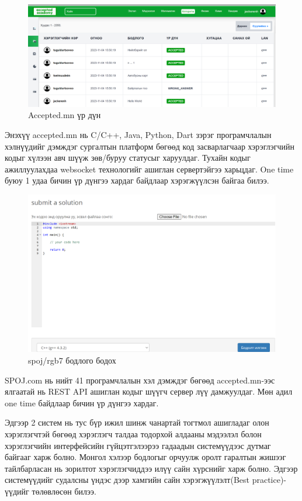 \begin{figure}[h]
  \centering
  \includegraphics[width=15cm]{img/accepted-judger.PNG}
  \caption{Accepted.mn үр дүн}
\end{figure}

Энэхүү accepted.mn\cite{acceptedmn} нь C/C++, Java, Python, Dart зэрэг програмчлалын хэлнүүдийг дэмждэг сургалтын платформ бөгөөд код засварлагчаар хэрэглэгчийн кодыг хүлээн авч шүүж зөв/буруу статусыг харуулдаг. Тухайн кодыг ажиллуулахдаа websocket технологийг ашиглан сервертэйгээ харьцдаг. One time буюу 1 удаа бичин үр дүнгээ хардаг байдлаар хэрэгжүүлсэн байгаа билээ. 

\begin{figure}[h]
  \centering
  \includegraphics[width=15cm]{img/spoj.PNG}
  \caption{spoj/rgb7 бодлого бодох}
\end{figure}

SPOJ.com\cite{spojmn} нь нийт 41 програмчлалын хэл дэмждэг бөгөөд accepted.mn-ээс ялгаатай нь REST API ашиглан кодыг шүүгч сервер лүү дамжуулдаг. Мөн адил one time байдлаар бичин үр дүнгээ хардаг. 

Эдгээр 2 систем нь тус бүр ижил шинж чанартай тогтмол ашигладаг олон хэрэглэгчтэй бөгөөд хэрэглэгч талдаа тодорхой алдааны мэдээлэл болон хэрэглэгчийн интерфейсийн гүйцэтгэлээрээ гадаадын системүүдээс дутмаг байгааг харж болно. Монгол хэлээр бодлогыг орчуулж оролт гаралтын жишээг тайлбарласан нь зорилтот хэрэглэгчиддээ илүү сайн хүрснийг харж болно. Эдгээр системүүдийг судалсны үндэс дээр хамгийн сайн хэрэгжүүлэлт(Best practice)-үүдийг төлөвлөсөн билээ.

